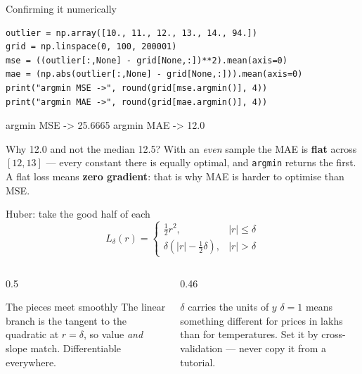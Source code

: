 \documentclass[aspectratio=169]{beamer}
\begin{document}
\begin{frame}[fragile]{Confirming it numerically}
\begin{lstlisting}
outlier = np.array([10., 11., 12., 13., 14., 94.])
grid = np.linspace(0, 100, 200001)
mse = ((outlier[:,None] - grid[None,:])**2).mean(axis=0)
mae = (np.abs(outlier[:,None] - grid[None,:])).mean(axis=0)
print("argmin MSE ->", round(grid[mse.argmin()], 4))
print("argmin MAE ->", round(grid[mae.argmin()], 4))
\end{lstlisting}
\begin{outblk}
argmin MSE -> 25.6665
argmin MAE -> 12.0
\end{outblk}
\begin{alertblock}{Why 12.0 and not the median 12.5?}
  \footnotesize With an \emph{even} sample the MAE is \textbf{flat} across
  $[12,13]$ --- every constant there is equally optimal, and \texttt{argmin}
  returns the first. A flat loss means \textbf{zero gradient}: that is why MAE
  is harder to optimise than MSE.
\end{alertblock}
\end{frame}

\begin{frame}{Huber: take the good half of each}
  \[
    L_\delta(r)=
    \begin{cases}
      \tfrac{1}{2}r^2, & |r| \le \delta\\[4pt]
      \delta\left(|r|-\tfrac{1}{2}\delta\right), & |r| > \delta
    \end{cases}
  \]
  \vspace{0.2em}
  \begin{columns}[T]
    \begin{column}{0.5\textwidth}
      \begin{block}{The pieces meet smoothly}
        The linear branch is the tangent to the quadratic at $r=\delta$, so
        value \emph{and} slope match. Differentiable everywhere.
      \end{block}
    \end{column}
    \begin{column}{0.46\textwidth}
      \begin{alertblock}{$\delta$ carries the units of $y$}
        $\delta = 1$ means something different for prices in lakhs than for
        temperatures. Set it by cross-validation --- never copy it from a
        tutorial.
      \end{alertblock}
    \end{column}
  \end{columns}
\end{frame}
\end{document}
